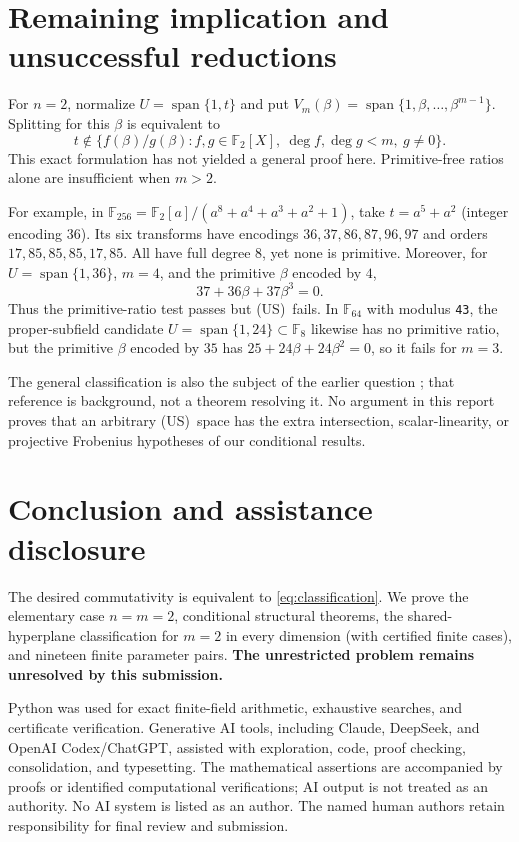 \documentclass[11pt,a4paper]{article}
\theoremstyle{definition}\newtheorem{definition}[theorem]{Definition}
\theoremstyle{remark}\newtheorem{remark}[theorem]{Remark}
\newcommand{\F}{\mathbb F}
\newcommand{\Span}{\operatorname{span}}
\newcommand{\US}{\textup{(US)}}
\numberwithin{equation}{section}
\begin{document}
\section{Remaining implication and unsuccessful reductions}\label{sec:open}
For $n=2$, normalize $U=\Span\{1,t\}$ and put $V_m(\beta)=\Span\{1,\beta,\ldots,\beta^{m-1}\}$. Splitting for this $\beta$ is equivalent to
\[
t\notin\{f(\beta)/g(\beta):f,g\in\F_2[X],\ \deg f,\deg g<m,\ g\ne0\}.
\]
This exact formulation has not yielded a general proof here. Primitive-free ratios alone are insufficient when $m>2$.

For example, in $\F_{256}=\F_2[a]/(a^8+a^4+a^3+a^2+1)$, take $t=a^5+a^2$ (integer encoding $36$). Its six transforms have encodings $36,37,86,87,96,97$ and orders $17,85,85,85,17,85$. All have full degree $8$, yet none is primitive. Moreover, for $U=\Span\{1,36\}$, $m=4$, and the primitive $\beta$ encoded by $4$,
\[
37+36\beta+37\beta^3=0.
\]
Thus the primitive-ratio test passes but \US\ fails. In $\F_{64}$ with modulus \texttt{43}, the proper-subfield candidate $U=\Span\{1,24\}\subset\F_8$ likewise has no primitive ratio, but the primitive $\beta$ encoded by $35$ has $25+24\beta+24\beta^2=0$, so it fails for $m=3$.

The general classification is also the subject of the earlier question \cite{goltvanitsa}; that reference is background, not a theorem resolving it. No argument in this report proves that an arbitrary \US\ space has the extra intersection, scalar-linearity, or projective Frobenius hypotheses of our conditional results.

\section{Conclusion and assistance disclosure}
The desired commutativity is equivalent to \eqref{eq:classification}. We prove the elementary case $n=m=2$, conditional structural theorems, the shared-hyperplane classification for $m=2$ in every dimension (with certified finite cases), and nineteen finite parameter pairs. \textbf{The unrestricted problem remains unresolved by this submission.}

Python was used for exact finite-field arithmetic, exhaustive searches, and certificate verification. Generative AI tools, including Claude, DeepSeek, and OpenAI Codex/ChatGPT, assisted with exploration, code, proof checking, consolidation, and typesetting. The mathematical assertions are accompanied by proofs or identified computational verifications; AI output is not treated as an authority. No AI system is listed as an author. The named human authors retain responsibility for final review and submission.
\end{document}
